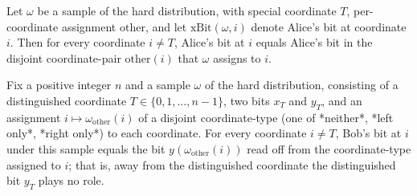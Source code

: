 \begin{theorem}
\label{CommunicationComplexity.Functions.Disjointness.RandomizedLowerBound.xBit_of_ne_special}
\leanok
{}
Let $\omega$ be a sample of the hard distribution, with special coordinate $T$,
per-coordinate assignment $\text{other}$, and let $\text{xBit}(\omega, i)$ denote
Alice's bit at coordinate $i$. Then for every coordinate $i \neq T$, Alice's bit at $i$
equals Alice's bit in the disjoint coordinate-pair $\text{other}(i)$ that $\omega$
assigns to $i$.
\end{theorem}

\begin{theorem}
\label{CommunicationComplexity.Functions.Disjointness.RandomizedLowerBound.yBit_of_ne_special}
\leanok
{}
Fix a positive integer $n$ and a sample $\omega$ of the hard distribution, consisting of
a distinguished coordinate $T \in \{0, 1, \dots, n-1\}$, two bits $x_T$ and $y_T$, and
an assignment $i \mapsto \omega_{\text{other}}(i)$ of a disjoint coordinate-type (one of
*neither*, *left only*, *right only*) to each coordinate. For every coordinate $i \ne
T$, Bob's bit at $i$ under this sample equals the bit $y(\omega_{\text{other}}(i))$ read
off from the coordinate-type assigned to $i$; that is, away from the distinguished
coordinate the distinguished bit $y_T$ plays no role.
\end{theorem}

